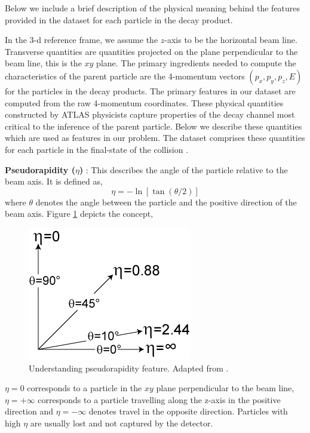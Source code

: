 Below we include a brief description of the physical meaning behind the features provided in the dataset for each particle in the decay product. 

In the 3-d reference frame, we assume the $z$-axis to be the horizontal beam line. Transverse quantities are quantities projected on the plane perpendicular to the beam line, this is the $xy$ plane. The primary ingredients needed to compute the characteristics of the parent particle are the 4-momentum vectors $(p_{x}, p_{y}, p_{z}, E)$ for the particles in the decay products. The primary features in our dataset are computed from the raw 4-momentum coordinates. These physical quantities constructed by ATLAS physicists capture properties of the decay channel most critical to the inference of the parent particle. Below we describe these quantities which are used as features in our problem. The dataset comprises these quantities for each particle in the final-state of the collision \cite{rm}.

\textbf{Pseudorapidity ($\eta$)} : This describes the angle of the particle relative to the beam axis. It is defined as, $$ \eta = -\ln [\tan(\theta/2)]$$ where $\theta$ denotes the angle between the particle and the positive direction of the beam axis. Figure \ref{pseudo} depicts the concept, 

\begin{figure}[ht]
\begin{center}
\includegraphics[scale=0.7]{images/Pseudorapidity2.png}
\caption{Understanding pseudorapidity feature. Adapted from \cite{pseudo}.}
\label{pseudo}
\end{center}
\end{figure} 

$\eta = 0 $ corresponds to a particle in the $xy$ plane perpendicular to the beam line, $\eta = +\infty$ corresponds to a particle travelling along the z-axis in the positive direction and $\eta = -\infty$ denotes travel in the opposite direction. Particles with high $\eta$ are usually lost and not captured by the detector. 

